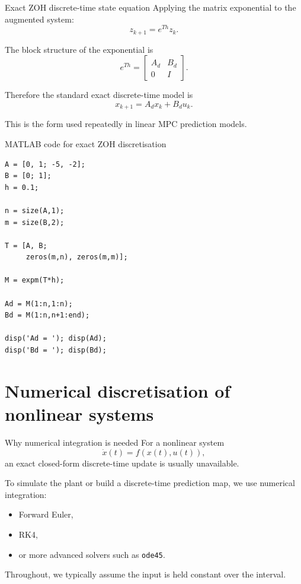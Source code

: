 \documentclass[aspectratio=169,10pt]{beamer}
\begin{document}
\begin{frame}{Exact ZOH discrete-time state equation}
Applying the matrix exponential to the augmented system:
\[
z_{k+1}=e^{Th}z_k.
\]

The block structure of the exponential is
\[
e^{Th}=
\begin{bmatrix}
A_d & B_d\\
0 & I
\end{bmatrix}.
\]

Therefore the standard exact discrete-time model is
\[
x_{k+1}=A_d x_k + B_d u_k.
\]

This is the form used repeatedly in linear MPC prediction models.
\end{frame}

\begin{frame}[fragile]{MATLAB code for exact ZOH discretisation}
\begin{lstlisting}[caption={MATLAB implementation of exact ZOH discretisation.}]
A = [0, 1; -5, -2];
B = [0; 1];
h = 0.1;

n = size(A,1);
m = size(B,2);

T = [A, B;
     zeros(m,n), zeros(m,m)];

M = expm(T*h);

Ad = M(1:n,1:n);
Bd = M(1:n,n+1:end);

disp('Ad = '); disp(Ad);
disp('Bd = '); disp(Bd);
\end{lstlisting}
\end{frame}

\section{Numerical discretisation of nonlinear systems}

\begin{frame}{Why numerical integration is needed}
For a nonlinear system
\[
\dot{x}(t)=f(x(t),u(t)),
\]
an exact closed-form discrete-time update is usually unavailable.

To simulate the plant or build a discrete-time prediction map, we use numerical integration:
\begin{itemize}
  \item Forward Euler,
  \item RK4,
  \item or more advanced solvers such as \texttt{ode45}.
\end{itemize}

Throughout, we typically assume the input is held constant over the interval.
\end{frame}
\end{document}
